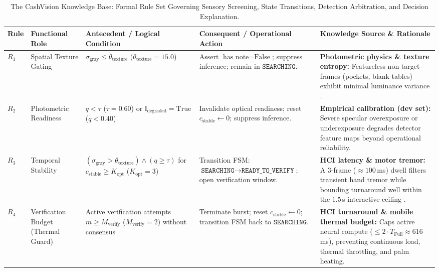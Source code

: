 \documentclass[final,5p,times,twocolumn,authoryear]{elsarticle}
\begin{document}
\begin{table}[t]
\centering

\caption{The CashVision Knowledge Base: Formal Rule Set Governing Sensory Screening, State Transitions, Detection Arbitration, and Decision Explanation.}
\label{tab:expert_rule_base}
\footnotesize
\renewcommand{\arraystretch}{1}
\setlength{\tabcolsep}{3pt}
\begin{tabularx}{\textwidth}{lp{2.6cm}p{4.2cm}p{4cm}p{6cm}}
\toprule
\textbf{Rule} & \textbf{Functional Role} & \textbf{Antecedent / Logical Condition} & \textbf{Consequent / Operational Action} & \textbf{Knowledge Source \& Rationale} \\
\midrule
$R_1$ & Spatial Texture Gating & $\sigma_{\text{gray}} \le \theta_{\text{texture}}$ \newline ($\theta_{\text{texture}} = 15.0$) & Assert $\text{has\_note} = \text{False}$; suppress inference; remain in $\texttt{SEARCHING}$. & \textbf{Photometric physics \& texture entropy:} Featureless non-target frames (pockets, blank tables) exhibit minimal luminance variance \cite{Haralick1979,Gonzalez2008}. \\
$R_2$ & Photometric Readiness & $q < \tau$ ($\tau = 0.60$) or \newline $\mathbb{I}_{\text{degraded}} = \text{True}$ ($q < 0.40$) & Invalidate optical readiness; reset $c_{\text{stable}} \leftarrow 0$; suppress inference. & \textbf{Empirical calibration (dev set):} Severe specular overexposure or underexposure degrades detector feature maps beyond operational reliability. \\
$R_3$ & Temporal Stability & $(\sigma_{\text{gray}} > \theta_{\text{texture}}) \land (q \ge \tau)$ \newline for $c_{\text{stable}} \ge K_{\text{opt}}$ ($K_{\text{opt}} = 3$) & Transition FSM: $\texttt{SEARCHING} \to \texttt{READY\_TO\_VERIFY}$; open verification window. & \textbf{HCI latency \& motor tremor:} A 3-frame ($\approx 100$\,ms) dwell filters transient hand tremor while bounding turnaround well within the $1.5$\,s interactive ceiling \cite{Nielsen1993}. \\
$R_4$ & Verification Budget (Thermal Guard) & Active verification attempts $m \ge M_{\text{verify}}$ ($M_{\text{verify}} = 2$) without consensus & Terminate burst; reset $c_{\text{stable}} \leftarrow 0$; transition FSM back to $\texttt{SEARCHING}$. & \textbf{HCI turnaround \& mobile thermal budget:} Caps active neural compute ($\le 2 \cdot T_{\text{Full}} \approx 616$\,ms), preventing continuous load, thermal throttling, and palm heating. \\

\end{tabularx}
\end{table}
\end{document}
